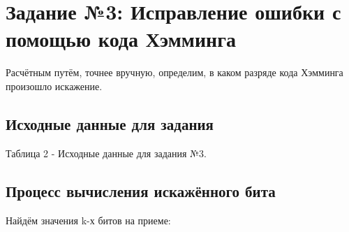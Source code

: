 \documentclass[11pt]{article}
\begin{document}
\newpage
\section{Задание №3: Исправление ошибки с помощью кода Хэмминга}
Расчётным путём, точнее вручную, определим, в каком разряде кода Хэмминга произошло искажение. 
\subsection{Исходные данные для задания}
\begin{table}[h]
    \end{table}
\begin{center}
        Таблица 2 - Исходные данные для задания №3.
\end{center}

\subsection{Процесс вычисления искажённого бита}
Найдём значения k-х битов на приеме:
\end{document}

